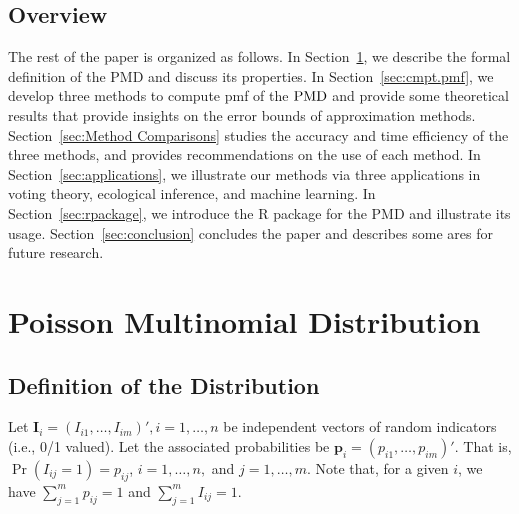 \documentclass[12pt]{article}
\newcommand{\Ivec}{{\boldsymbol{I}}}
\newcommand{\pvec}{\boldsymbol{p}}
\newcommand{\PMD}{{\normalfont\textrm{PMD}}}
\begin{document}






\subsection{Overview}
The rest of the paper is organized as follows. In Section~\ref{sec:pmd}, we describe the formal definition of the PMD and discuss its properties. In Section~\ref{sec:cmpt.pmf}, we develop three methods to compute pmf of the $\PMD$ and provide some theoretical results that provide insights on the error bounds of approximation methods. Section~\ref{sec:Method Comparisons} studies the accuracy and time efficiency of the three methods, and provides recommendations on the use of each method. In Section~\ref{sec:applications}, we illustrate our methods via three applications in voting theory, ecological inference, and machine learning. In Section~\ref{sec:rpackage}, we introduce the R package for the PMD and illustrate its usage. Section~\ref{sec:conclusion} concludes the paper and describes some ares for future research.



\section{Poisson Multinomial Distribution} \label{sec:pmd}
\subsection{Definition of the Distribution}
Let $\Ivec_{i} = (I_{i1}, \dots, I_{im})', i=1, \dots, n$ be independent vectors of random indicators (i.e., 0/1 valued). Let the associated probabilities be $\pvec_{i} = (p_{i1}, \dots, p_{im})'$. That is, $\Pr(I_{ij}=1)=p_{ij}$, $i=1,\ldots, n,$ and  $j=1, \ldots, m$. Note that, for a given $i$, we have $\sum_{j=1}^{m}p_{ij}=1$ and $\sum_{j=1}^{m}I_{ij}=1$.
\end{document}
